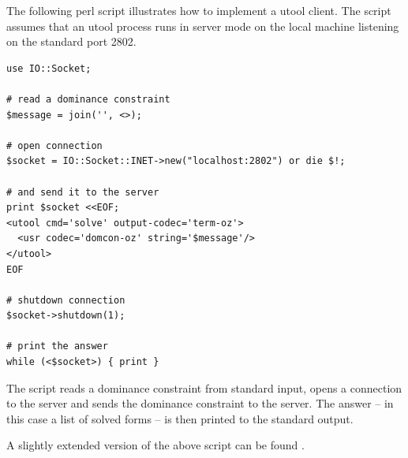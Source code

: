 The following perl script illustrates how to implement a utool client.
The script assumes that an utool process runs in server mode on the
local machine listening on the standard port 2802.

\begin{verbatim}
use IO::Socket;

# read a dominance constraint
$message = join('', <>);

# open connection
$socket = IO::Socket::INET->new("localhost:2802") or die $!;

# and send it to the server
print $socket <<EOF;
<utool cmd='solve' output-codec='term-oz'>
  <usr codec='domcon-oz' string='$message'/>
</utool>
EOF

# shutdown connection
$socket->shutdown(1);

# print the answer 
while (<$socket>) { print }
\end{verbatim}

The script reads a dominance constraint from standard input, opens a
connection to the server and sends the dominance constraint to the
server. The answer -- in this case a list of solved forms -- is then
printed to the standard output.

A slightly extended version of the above script can be found
.



